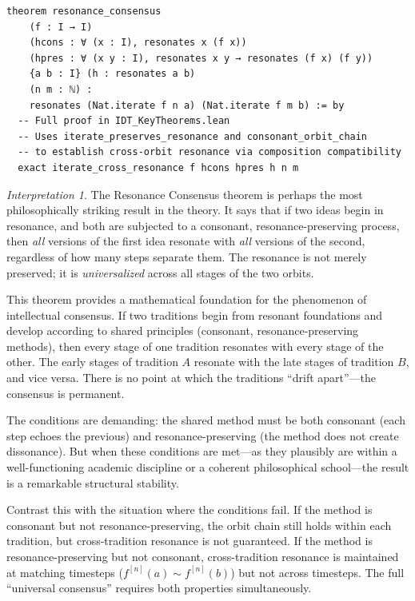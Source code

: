 \documentclass[11pt,openany]{book}
\theoremstyle{definition}
\theoremstyle{plain}
\theoremstyle{remark}
\newtheorem{interpretation}[axiom]{Interpretation}
\newcommand{\res}{\sim}                      %
\begin{document}
\begin{lstlisting}
theorem resonance_consensus
    (f : I → I)
    (hcons : ∀ (x : I), resonates x (f x))
    (hpres : ∀ (x y : I), resonates x y → resonates (f x) (f y))
    {a b : I} (h : resonates a b)
    (n m : ℕ) :
    resonates (Nat.iterate f n a) (Nat.iterate f m b) := by
  -- Full proof in IDT_KeyTheorems.lean
  -- Uses iterate_preserves_resonance and consonant_orbit_chain
  -- to establish cross-orbit resonance via composition compatibility
  exact iterate_cross_resonance f hcons hpres h n m
\end{lstlisting}

\begin{interpretation}
The Resonance Consensus theorem is perhaps the most philosophically striking result in the theory. It says that if two ideas begin in resonance, and both are subjected to a consonant, resonance-preserving process, then \emph{all} versions of the first idea resonate with \emph{all} versions of the second, regardless of how many steps separate them. The resonance is not merely preserved; it is \emph{universalized} across all stages of the two orbits.

This theorem provides a mathematical foundation for the phenomenon of intellectual consensus. If two traditions begin from resonant foundations and develop according to shared principles (consonant, resonance-preserving methods), then every stage of one tradition resonates with every stage of the other. The early stages of tradition $A$ resonate with the late stages of tradition $B$, and vice versa. There is no point at which the traditions ``drift apart''---the consensus is permanent.

The conditions are demanding: the shared method must be both consonant (each step echoes the previous) and resonance-preserving (the method does not create dissonance). But when these conditions are met---as they plausibly are within a well-functioning academic discipline or a coherent philosophical school---the result is a remarkable structural stability.

Contrast this with the situation where the conditions fail. If the method is consonant but not resonance-preserving, the orbit chain still holds within each tradition, but cross-tradition resonance is not guaranteed. If the method is resonance-preserving but not consonant, cross-tradition resonance is maintained at matching timesteps ($f^{[n]}(a) \res f^{[n]}(b)$) but not across timesteps. The full ``universal consensus'' requires both properties simultaneously.
\end{interpretation}
\end{document}
